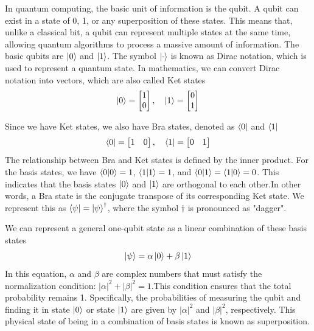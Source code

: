 \documentclass[11pt, letterpaper]{article}
\begin{document}
In quantum computing, the basic unit of information is the qubit. A qubit can exist in a state of 0, 1, or any superposition of these states. This means that, unlike a classical bit, a qubit can represent multiple states at the same time, allowing quantum algorithms to process a massive amount of information. The basic qubits are $\ket{0}$ and $\ket{1}$. The symbol $\ket{\cdot}$ is known as Dirac notation, which is used to represent a quantum state. In mathematics, we can convert Dirac notation into vectors, which are also called Ket states
\begin{equation}
    \ket{0} = \begin{bmatrix} 1 \\ 0 \end{bmatrix}, \quad \ket{1} = \begin{bmatrix} 0 \\ 1 \end{bmatrix}
\end{equation}

Since we have Ket states, we also have Bra states, denoted as $\bra{0}$ and $\bra{1}$
\begin{equation}
    \bra{0} = \begin{bmatrix} 1 & 0 \end{bmatrix}, \quad \bra{1} = \begin{bmatrix} 0 & 1 \end{bmatrix}
\end{equation}
The relationship between Bra and Ket states is defined by the inner product. For the basis states, we have $\braket{0|0} = 1$, $\braket{1|1} = 1$, and $\braket{0|1} = \braket{1|0} = 0$. This indicates that the basis states $\ket{0}$ and $\ket{1}$ are orthogonal to each other.In other words, a Bra state is the conjugate transpose of its corresponding Ket state. We represent this as $\bra{\psi} = \ket{\psi}^\dagger$, where the symbol $\dagger$ is pronounced as "dagger".

We can represent a general one-qubit state as a linear combination of these basis states
\begin{equation}
  \ket{\psi} = \alpha \ket{0} + \beta \ket{1}
  \label{eq: superposition}
\end{equation}
In this equation, $\alpha$ and $\beta$ are complex numbers that must satisfy the normalization condition: $|\alpha|^2 + |\beta|^2 = 1$.This condition ensures that the total probability remains 1. Specifically, the probabilities of measuring the qubit and finding it in state $\ket{0}$ or state $\ket{1}$ are given by $|\alpha|^2$ and $|\beta|^2$, respectively. This physical state of being in a combination of basis states is known as superposition.
\end{document}
